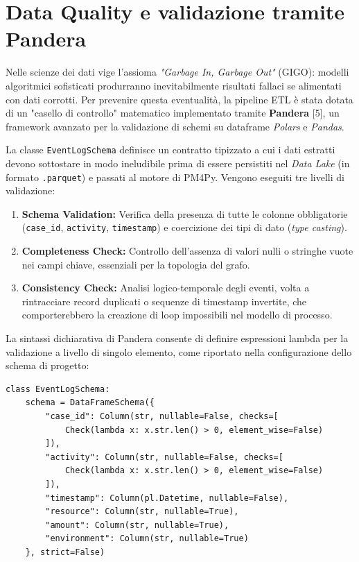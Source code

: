 \documentclass[12pt, a4paper]{report}
\begin{document}

\section{Data Quality e validazione tramite Pandera}
Nelle scienze dei dati vige l'assioma \textit{"Garbage In, Garbage Out"} (GIGO): modelli algoritmici sofisticati produrranno inevitabilmente risultati fallaci se alimentati con dati corrotti. Per prevenire questa eventualità, la pipeline ETL è stata dotata di un "casello di controllo" matematico implementato tramite \textbf{Pandera} [5], un framework avanzato per la validazione di schemi su dataframe \textit{Polars} e \textit{Pandas}.

La classe \texttt{EventLogSchema} definisce un contratto tipizzato a cui i dati estratti devono sottostare in modo ineludibile prima di essere persistiti nel \textit{Data Lake} (in formato \texttt{.parquet}) e passati al motore di PM4Py. Vengono eseguiti tre livelli di validazione:
\begin{enumerate}
    \item \textbf{Schema Validation:} Verifica della presenza di tutte le colonne obbligatorie (\texttt{case\_id}, \texttt{activity}, \texttt{timestamp}) e coercizione dei tipi di dato (\textit{type casting}).
    \item \textbf{Completeness Check:} Controllo dell'assenza di valori nulli o stringhe vuote nei campi chiave, essenziali per la topologia del grafo.
    \item \textbf{Consistency Check:} Analisi logico-temporale degli eventi, volta a rintracciare record duplicati o sequenze di timestamp invertite, che comporterebbero la creazione di loop impossibili nel modello di processo.
\end{enumerate}

La sintassi dichiarativa di Pandera consente di definire espressioni lambda per la validazione a livello di singolo elemento, come riportato nella configurazione dello schema di progetto:

\begin{verbatim}
class EventLogSchema:
    schema = DataFrameSchema({
        "case_id": Column(str, nullable=False, checks=[
            Check(lambda x: x.str.len() > 0, element_wise=False)
        ]),
        "activity": Column(str, nullable=False, checks=[
            Check(lambda x: x.str.len() > 0, element_wise=False)
        ]),
        "timestamp": Column(pl.Datetime, nullable=False),
        "resource": Column(str, nullable=True),
        "amount": Column(str, nullable=True),
        "environment": Column(str, nullable=True)
    }, strict=False)
\end{verbatim}
\end{document}
